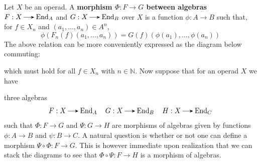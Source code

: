 \begin{definition}
    Let $X$ be an operad. A \textbf{morphism $\Phi: F \to G$ 
    between algebras}
    $F: X \to \aend_A$ and $G: X \to \aend_B$ over $X$ is a function 
    $\phi: A \to B$ such that, for $f \in X_n$ and $(a_1, \dots, a_n) \in A^n$, 
    \[
        \phi(F_n(f)(a_1, \dots, a_n)) = G(f)(\phi(a_1), \dots, \phi(a_n))
    \]
    The above relation can be more conveniently expressed as the diagram below 
    commuting: 
    \begin{center}
    \end{center}
    which must hold for all $f \in X_n$ with $n \in \mathbb{N}$. 
    Now suppose that for an operad $X$ we have

    \noindent
    \begin{minipage}{0.7\textwidth}        
        three algebras 
        \[
            F: X \to \aend_A \quad G: X \to \aend_B \quad H: X \to \aend_C
        \] 
        such that $\Phi: F \to G$ 
        and $\Psi: G \to H$ are morphisms of algebras given by functions 
        $\phi: A \to B$ and $\psi: B \to C$. A natural question is whether 
        or not one can define a morphism $\Psi \circ \Phi: F \to G$. This is however 
        immediate upon realization that we can stack the diagrams to see 
        that $\Phi \circ \Psi: F \to H$ is a morphism of algebras.
    \end{minipage}
    \begin{minipage}{0.3\textwidth}
        \begin{center}
        \end{center}
    \end{minipage}
\end{definition}

